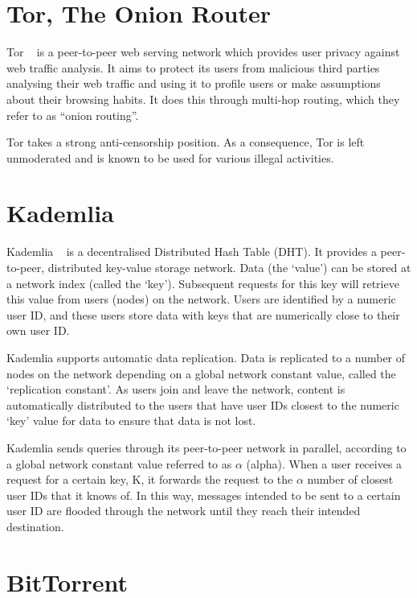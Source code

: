 \section{Tor, The Onion Router}

Tor ~\cite{tor} is a peer-to-peer web serving network which provides user privacy against web traffic analysis.
It aims to protect its users from malicious third parties analysing their web traffic and using it to
profile users or make assumptions about their browsing habits. It does this through multi-hop routing,
which they refer to as ``onion routing''.

Tor takes a strong anti-censorship position. As a consequence, Tor is left unmoderated and is known
to be used for various illegal activities.

\section{Kademlia}

Kademlia ~\cite{kademlia} is a decentralised Distributed Hash Table (DHT). It provides a peer-to-peer,
distributed key-value storage network. Data (the `value') can be stored at a network index (called the `key').
Subsequent requests for this key will retrieve this value from users (nodes) on the network.
Users are identified by a numeric user ID, and these users store data with keys that are numerically
close to their own user ID.

Kademlia supports automatic data replication. Data is replicated to a number of nodes on the network depending
on a global network constant value, called the `replication constant'.
As users join and leave the network, content is automatically distributed to the users that have user IDs
closest to the numeric `key' value for data to ensure that data is not lost.

Kademlia sends queries through its peer-to-peer network in parallel, according to a global network constant value
referred to as \(\alpha\) (alpha). When a user receives a request for a certain key, K, it forwards the request to the
\(\alpha\) number of closest user IDs that it knows of. In this way, messages intended to be sent to a certain user ID
are flooded through the network until they reach their intended destination.

\section{BitTorrent}

